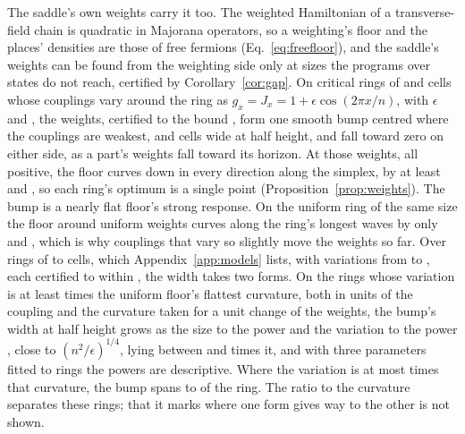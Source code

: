 \documentclass[aps,prd,reprint,superscriptaddress]{revtex4-2}
\begin{document}
The saddle's own weights carry it too. The weighted Hamiltonian of a transverse-field chain is quadratic in Majorana operators, so a weighting's floor and the places' densities are those of free fermions (Eq.~\eqref{eq:freefloor}), and the saddle's weights can be found from the weighting side only at sizes the programs over states do not reach, certified by Corollary~\ref{cor:gap}. On critical rings of  and  cells whose couplings vary around the ring as $g_x = J_x = 1 + \epsilon \cos(2\pi x/n)$, with $\epsilon$  and , the weights, certified to the bound , form one smooth bump centred where the couplings are weakest,  and  cells wide at half height, and fall toward zero on either side, as a part's weights fall toward its horizon. At those weights, all positive, the floor curves down in every direction along the simplex, by at least  and , so each ring's optimum is a single point (Proposition~\ref{prop:weights}). The bump is a nearly flat floor's strong response. On the uniform ring of the same size the floor around uniform weights curves along the ring's longest waves by only  and , which is why couplings that vary so slightly move the weights so far. Over  rings of  to  cells, which Appendix~\ref{app:models} lists, with variations from  to , each certified to within , the width takes two forms. On the  rings whose variation is at least  times the uniform floor's flattest curvature, both in units of the coupling and the curvature taken for a unit change of the weights, the bump's width at half height grows as the size to the power  and the variation to the power , close to $(n^2/\epsilon)^{1/4}$, lying between  and  times it, and with three parameters fitted to  rings the powers are descriptive. Where the variation is at most  times that curvature, the bump spans  to  of the ring. The ratio to the curvature separates these rings; that it marks where one form gives way to the other is not shown.
\end{document}
